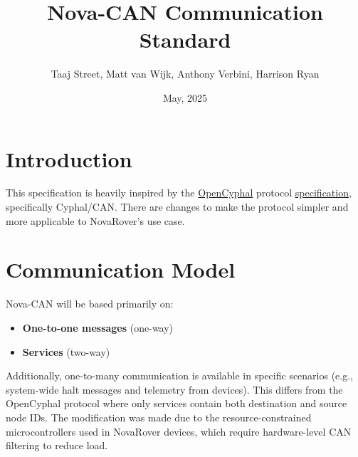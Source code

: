 \documentclass[a4paper,12pt]{article}
\title{Nova-CAN Communication Standard}
\author{Taaj Street, Matt van Wijk, Anthony Verbini, Harrison Ryan}
\date{May, 2025}
\begin{document}
\maketitle
\tableofcontents
\newpage

\section{Introduction}
This specification is heavily inspired by the \href{https://opencyphal.org/}{OpenCyphal} 
protocol \href{https://opencyphal.org/specification/Cyphal_Specification.pdf}{specification}, specifically Cyphal/CAN. 
There are changes to make the protocol simpler and more applicable to NovaRover's use case.

\section{Communication Model}
Nova-CAN will be based primarily on:
\begin{itemize}
    \item \textbf{One-to-one messages} (one-way)
    \item \textbf{Services} (two-way)
\end{itemize}

Additionally, one-to-many communication is available in specific scenarios (e.g., system-wide halt messages and telemetry from devices). 
This differs from the OpenCyphal protocol where only services contain both destination and source node IDs. The modification was made 
due to the resource-constrained microcontrollers used in NovaRover devices, which require hardware-level CAN filtering to reduce load.
\end{document}

